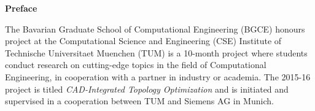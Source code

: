 \clearemptydoublepage
{}
{}	


\vspace*{3cm}

\begin{flushleft}
{\Large \bf Preface}
\end{flushleft}

\vspace{1cm}
The Bavarian Graduate School of Computational Engineering (BGCE) honours project at the Computational Science and Engineering (CSE) Institute of Technische Universitaet Muenchen (TUM) is a 10-month project where students conduct research on cutting-edge topics in the field of Computational Engineering, in cooperation with a partner in industry or academia. The 2015-16 project is titled \emph{CAD-Integrated Topology Optimization} and is initiated and supervised in a cooperation between TUM and Siemens AG in Munich.


\newpage

